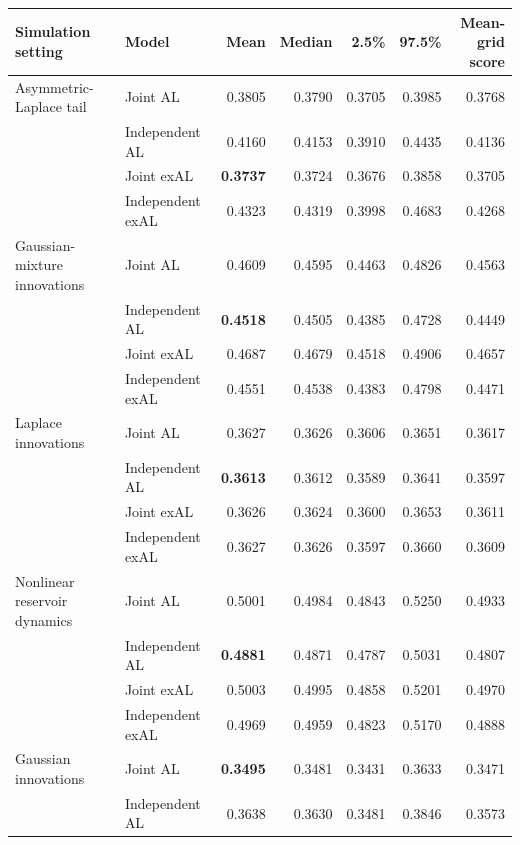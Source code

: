 \begin{table}[p]
\centering
\footnotesize
\setlength{\tabcolsep}{3pt}
\renewcommand{\arraystretch}{1.08}
\begin{tabular}{@{}>{\raggedright\arraybackslash}p{}>{\raggedright\arraybackslash}p{}rrrrr@{}}
\toprule
Simulation setting & Model & Mean & Median & 2.5\% & 97.5\% & \shortstack{Mean-grid\\score} \\
\midrule
Asymmetric-Laplace tail & Joint AL & 0.3805 & 0.3790 & 0.3705 & 0.3985 & 0.3768 \\
 & Independent AL & 0.4160 & 0.4153 & 0.3910 & 0.4435 & 0.4136 \\
 & Joint exAL & \textbf{0.3737} & 0.3724 & 0.3676 & 0.3858 & 0.3705 \\
 & Independent exAL & 0.4323 & 0.4319 & 0.3998 & 0.4683 & 0.4268 \\
\addlinespace[2pt]
Gaussian-mixture innovations & Joint AL & 0.4609 & 0.4595 & 0.4463 & 0.4826 & 0.4563 \\
 & Independent AL & \textbf{0.4518} & 0.4505 & 0.4385 & 0.4728 & 0.4449 \\
 & Joint exAL & 0.4687 & 0.4679 & 0.4518 & 0.4906 & 0.4657 \\
 & Independent exAL & 0.4551 & 0.4538 & 0.4383 & 0.4798 & 0.4471 \\
\addlinespace[2pt]
Laplace innovations & Joint AL & 0.3627 & 0.3626 & 0.3606 & 0.3651 & 0.3617 \\
 & Independent AL & \textbf{0.3613} & 0.3612 & 0.3589 & 0.3641 & 0.3597 \\
 & Joint exAL & 0.3626 & 0.3624 & 0.3600 & 0.3653 & 0.3611 \\
 & Independent exAL & 0.3627 & 0.3626 & 0.3597 & 0.3660 & 0.3609 \\
\addlinespace[2pt]
Nonlinear reservoir dynamics & Joint AL & 0.5001 & 0.4984 & 0.4843 & 0.5250 & 0.4933 \\
 & Independent AL & \textbf{0.4881} & 0.4871 & 0.4787 & 0.5031 & 0.4807 \\
 & Joint exAL & 0.5003 & 0.4995 & 0.4858 & 0.5201 & 0.4970 \\
 & Independent exAL & 0.4969 & 0.4959 & 0.4823 & 0.5170 & 0.4888 \\
\addlinespace[2pt]
Gaussian innovations & Joint AL & \textbf{0.3495} & 0.3481 & 0.3431 & 0.3633 & 0.3471 \\
 & Independent AL & 0.3638 & 0.3630 & 0.3481 & 0.3846 & 0.3573 \\

\end{tabular}
\end{table}
